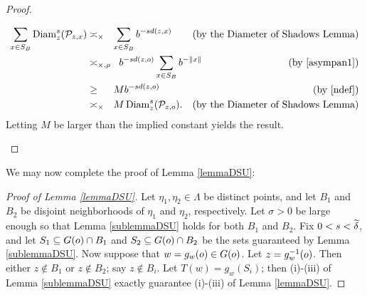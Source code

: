 \begin{proof}
\begin{subproof}
{}%
\end{subproof}
\begin{subproof}
\begin{align*}
\sum_{x\in S_B}\Diam_z^s(\PP_{z,x})
&\asymp_{\times\phantom{,\rho}} \sum_{x\in S_B}b^{-s\dist(z,x)} \by{the Diameter of Shadows Lemma}\\
&\asymp_{\times,\rho} \;\; b^{-s\dist(z,\zero)}\sum_{x\in S_B}b^{-\dox x} \hspace{-0.85in}\by{\eqref{asympan1}}\\
&\geq_{\phantom{\times,\rho}}Mb^{-s\dist(z,\zero)} \by{\eqref{ndef}}\\
&\asymp_{\times\phantom{,\rho}} M\Diam_z^s(\PP_{z,\zero}). \by{the Diameter of Shadows Lemma}
\end{align*}
Letting $M$ be larger than the implied constant yields the result.
\end{subproof}
\end{proof}

We may now complete the proof of Lemma \ref{lemmaDSU}:

\begin{proof}[Proof of Lemma \ref{lemmaDSU}]
Let $\eta_1,\eta_2\in\Lambda$ be distinct points, and let $B_1$ and $B_2$ be disjoint neighborhoods of $\eta_1$ and $\eta_2$, respectively. Let $\sigma > 0$ be large enough so that Lemma \ref{sublemmaDSU} holds for both $B_1$ and $B_2$. Fix $0 < s < \widetilde\delta$, and let $S_1\subseteq G(o)\cap B_1$ and $S_2\subseteq G(o)\cap B_2$ be the sets guaranteed by Lemma \ref{sublemmaDSU}. Now suppose that $w = g_w(o)\in G(o)$. Let $z = g_w^{-1}(o)$. Then either $z\notin B_1$ or $z\notin B_2$; say $z\notin B_i$. Let $T(w) = g_w(S_i)$; then (i)-(iii) of Lemma \ref{sublemmaDSU} exactly guarantee (i)-(iii) of Lemma \ref{lemmaDSU}.
\end{proof}




